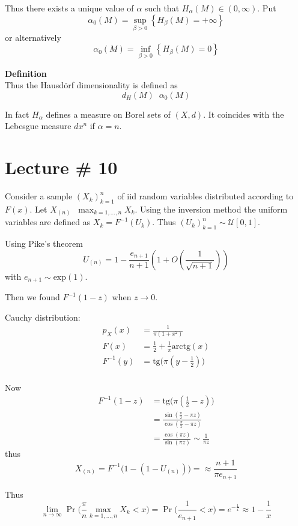 \documentclass[a4paper]{article}
\newcommand{\obj}[1]{{\left\{ #1 \right \}}}
\newcommand{\clo}[1]{{\left [ #1 \right ]}}
\newcommand{\brac}[1]{{\left ( #1 \right )}}
\newcommand{\defn}{\mathop{\overset{\Delta}{=}}\nolimits}
\begin{document}
Thus there exists a unique value of $\alpha$ such that $H_\alpha(M) \in (0,\infty)$. Put 
\[\alpha_0(M) = \sup_{\beta>0} \obj{ H_\beta(M) = +\infty }\]
or alternatively
\[\alpha_0(M) = \inf_{\beta>0} \obj{ H_\beta(M) = 0 }\]

\noindent\textbf{Definition}\hfill\\
Thus the Hausd\"orf dimensionality is defined as 
\[d_H(M) \defn \alpha_0(M)\]

In fact $H_\alpha$ defines a measure on Borel sets of $(X, d)$. It coincides with the Lebesgue measure $dx^n$ if $\alpha = n$.



\section{Lecture \# 10} %
\label{sec:lecture_10}

Consider a sample $\brac{X_k}_{k=1}^n$ of iid random variables distributed according to $F(x)$. Let $X_{(n)} \defn \max_{k=1,\ldots,n} X_k$. Using the inversion method the uniform variables are defined as $X_k = F^{-1}(U_k)$. Thus $\brac{U_k}_{k=1}^n\sim \mathcal{U}\clo{0,1}$.

Using Pike's theorem
\[U_{(n)} = 1 - \frac{e_{n+1}}{n+1}\brac{1+O(\frac{1}{\sqrt{n+1}})}\] with $e_{n+1}\sim\text{exp}(1)$.

Then we found $F^{-1}(1-z)$ when $z\to 0$.

Cauchy distribution:
\begin{align*}
	p_X(x) &= \frac{1}{\pi(1+x^2)} \\
	F(x) &= \frac{1}{2} + \frac{1}{\pi} \text{arctg}(x) \\
	F^{-1}(y) &= \text{tg}\big(\pi (y-\frac{1}{2}) \big) \\
\end{align*}

Now \begin{align*}
	F^{-1}(1-z)
	& = \text{tg}\big(\pi (\frac{1}{2}-z) \big)\\
	& = \frac{\sin(\frac{\pi}{2} - \pi z)}{\cos(\frac{\pi}{2} - \pi z)}\\
	& = \frac{\cos(\pi z)}{\sin(\pi z)} \sim \frac{1}{\pi z}
\end{align*}
thus 
\[X_{(n)} = F^{-1}\big( 1 - (1-U_{(n)}) \big) = \approx \frac{n+1}{\pi e_{n+1}}\]

Thus 
\[\lim_{n\to \infty}\Pr\big( \frac{\pi}{n}\max_{k=1,\ldots,n}X_k < x \big) = \Pr\big(\frac{1}{e_{n+1}} < x\big) = e^{-\frac{1}{x}} \approx 1-\frac{1}{x}\]
\end{document}

